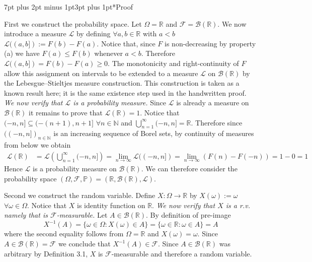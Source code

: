 \documentclass[11pt,a4paper]{article}
\makeatletter
\renewcommand{\subsubsection}{\@startsection{subsubsection}{3}{0pt}
  {7pt plus 2pt minus 1pt}{3pt plus 1pt}{\normalfont\normalsize\bfseries\boldmath\color{StudyBlue}}}
\makeatother
\begin{document}
\subsubsection*{Proof}%
%

First we construct the probability space. Let $\Omega=\mathbb R$ and $\mathcal F=\mathcal B(\mathbb R)$.
We now introduce a measure $\mathcal L$ by defining $\forall a,b\in\mathbb R$ with $a<b$
$\mathcal L((a,b]):=F(b)-F(a)$.
Notice that, since $F$ is non-decreasing by property (a) we have $F(a)\le F(b)$ whenever $a<b$.
Therefore $\mathcal L((a,b])=F(b)-F(a)\ge0$.
The monotonicity and right-continuity of $F$ allow this assignment on intervals to be extended
to a measure $\mathcal L$ on $\mathcal B(\mathbb R)$ by the Lebesgue--Stieltjes measure construction. This construction is taken as a known result here; it is the same existence step used in the handwritten proof.
\emph{We now verify that $\mathcal L$ is a probability measure.}
Since $\mathcal L$ is already a measure on $\mathcal B(\mathbb R)$ it remains to prove that $\mathcal L(\mathbb R)=1$.
Notice that $(-n,n]\subseteq(-(n+1),n+1]$ $\forall n\in\mathbb N$ and $\bigcup_{n=1}^{\infty}(-n,n]=\mathbb R$.
Therefore since $((-n,n])_{n\in\mathbb N}$ is an increasing sequence of Borel sets,
by continuity of measures from below we obtain
\[
\begin{aligned}
\mathcal L(\mathbb R)&=\mathcal L\left(\bigcup_{n=1}^{\infty}(-n,n]\right)
=\lim_{n\to\infty}\mathcal L((-n,n]) =\lim_{n\to\infty}(F(n)-F(-n))=1-0=1
\end{aligned}
\]
Hence $\mathcal L$ is a probability measure on $\mathcal B(\mathbb R)$.
We can therefore consider the probability space $(\Omega,\mathcal F,\mathbb P)=(\mathbb R,\mathcal B(\mathbb R),\mathcal L)$.

Second we construct the random variable. Define $X:\Omega\to\mathbb R$ by $X(\omega):=\omega$ $\forall\omega\in\Omega$.
Notice that $X$ is identity function on $\mathbb R$.
\emph{We now verify that $X$ is a r.v. namely that is $\mathcal F$-measurable.}
Let $A\in\mathcal B(\mathbb R)$.
By definition of pre-image
\[
X^{-1}(A)=\{\omega\in\Omega:X(\omega)\in A\}=\{\omega\in\mathbb R:\omega\in A\}=A
\]
where the second equality follows from $\Omega=\mathbb R$ and $X(\omega)=\omega$.
Since $A\in\mathcal B(\mathbb R)=\mathcal F$ we conclude that $X^{-1}(A)\in\mathcal F$.
Since $A\in\mathcal B(\mathbb R)$ was arbitrary by Definition 3.1, $X$ is $\mathcal F$-measurable and therefore a random variable.
\end{document}
